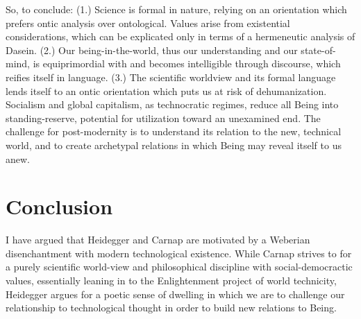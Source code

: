 \documentclass[leqno, 12pt]{turabian-researchpaper}
\begin{document}

	So, to conclude: (1.) Science is formal in nature, relying on an orientation which
	prefers ontic analysis over ontological. Values arise from existential
	considerations, which can be explicated only in terms of a hermeneutic analysis
	of Dasein. (2.) Our being-in-the-world, thus our understanding and our state-of-mind,
	is equiprimordial with and becomes intelligible through discourse, which reifies
	itself in language. (3.) The scientific worldview and its formal language
	lends itself to an ontic orientation which puts us at risk of dehumanization. Socialism
	and global capitalism, as technocratic regimes, reduce all Being into standing-reserve,
	potential for utilization toward an unexamined end. The challenge for post-modernity
	is to understand its relation to the new, technical world, and to create archetypal
	relations in which Being may reveal itself to us anew.

	\section{Conclusion}

	I have argued that Heidegger and Carnap are motivated by a Weberian
	disenchantment with modern technological existence. While Carnap strives to for
	a purely scientific world-view and philosophical discipline with social-democractic
	values, essentially leaning in to the Enlightenment project of world
	technicity, Heidegger argues for a poetic sense of dwelling in which we are to
	challenge our relationship to technological thought in order to build new relations
	to Being.
\end{document}
